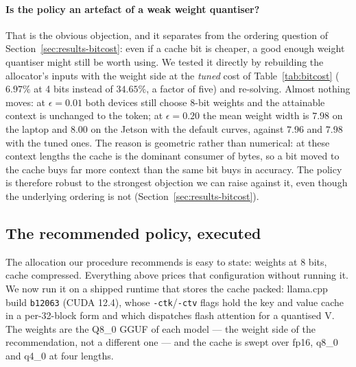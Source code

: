 \documentclass[5p]{elsarticle}
\begin{document}
\paragraph*{Is the policy an artefact of a weak weight quantiser?}
That is the obvious objection, and it separates from the ordering question of
Section~\ref{sec:results-bitcost}: even if a cache bit is cheaper, a good enough
weight quantiser might still be worth using. We tested it directly by rebuilding
the allocator's inputs with the weight side at the \emph{tuned} cost of
Table~\ref{tab:bitcost} ($6.97\%$ at 4 bits instead of $34.65\%$, a factor of
five) and re-solving. Almost nothing moves: at $\epsilon{=}0.01$ both devices
still choose 8-bit weights and the attainable context is unchanged to the token;
at $\epsilon{=}0.20$ the mean weight width is $7.98$ on the laptop and $8.00$ on the Jetson
with the default curves, against $7.96$ and $7.98$ with the tuned ones. The reason is geometric rather
than numerical: at these context lengths the cache is the dominant consumer of
bytes, so a bit moved to the cache buys far more context than the same bit buys
in accuracy. The policy is therefore robust to the strongest objection we can
raise against it, even though the underlying ordering is not
(Section~\ref{sec:results-bitcost}).

\subsection{The recommended policy, executed}
\label{sec:results-exec}

The allocation our procedure recommends is easy to state: weights at 8 bits, cache
compressed. Everything above prices that configuration without running it. We now
run it on a shipped runtime that stores the cache packed: llama.cpp build
\texttt{b12063} (CUDA 12.4), whose \texttt{-ctk}/\texttt{-ctv} flags hold the key
and value cache in a per-32-block form and which dispatches flash attention for a
quantised V. The weights are the Q8\_0 GGUF of each model --- the weight side of the
recommendation, not a different one --- and the cache is swept over fp16, q8\_0 and
q4\_0 at four lengths.
\end{document}
